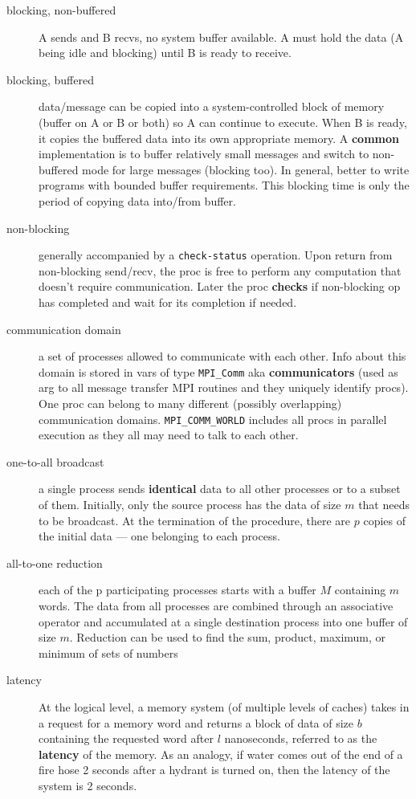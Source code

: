 \begin{description}
\item[blocking, non-buffered] A sends and B recvs, no system buffer available.  A must hold the data (A being idle and blocking) until B is ready to receive.

\item[blocking, buffered] data/message can be copied into a system-controlled block of memory (buffer on A or B or both) so A can continue to execute.  When B is ready, it copies the buffered data into its own appropriate memory.  A \textbf{common} implementation is to buffer relatively small messages and switch to non-buffered mode for large messages (blocking too).  In general, better to write programs with bounded buffer requirements.  This blocking time is only the period of copying data into/from buffer.
\item[non-blocking] generally accompanied by a \texttt{check-status} operation.  Upon return from non-blocking send/recv, the proc is free to perform any computation that doesn't require communication.  Later the proc \textbf{checks} if non-blocking op has completed and wait for its completion if needed.
\item[communication domain] a set of processes allowed to communicate with each other.  Info about this domain is stored in vars of type \texttt{MPI\_Comm} aka \textbf{communicators} (used as arg to all message transfer MPI routines and they uniquely identify procs). One proc can belong to many different (possibly overlapping) communication domains.  \texttt{MPI\_COMM\_WORLD} includes all procs in parallel execution as they all may need to talk to each other.

\item[one-to-all broadcast] a single process sends \textbf{identical} data to all other processes or to a subset of them.  Initially, only the source process has the data of size $m$ that needs to be broadcast.  At the termination of the procedure, there are $p$ copies of the initial data --- one belonging to each process.

\item[all-to-one reduction] each of the p participating processes starts with a buffer $M$ containing $m$ words.  The data from all processes are combined through an associative operator and accumulated at a single destination process into one buffer of size $m$.  Reduction can be used to find the sum, product, maximum, or minimum of sets of numbers

\item[latency] At the logical level, a memory system (of multiple levels of caches) takes in a request for a memory word and returns a block of data of size $b$ containing the requested word after $l$ nanoseconds, referred to as the \textbf{latency} of the memory.  As an analogy, if water comes out of the end of a fire hose 2 seconds after a hydrant is turned on, then the latency of the system is 2 seconds.



\end{description}
